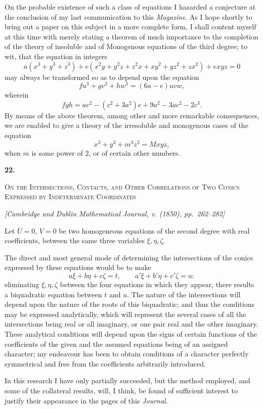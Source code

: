 \documentclass[11pt]{article}
\newcommand{\paperhead}[3]{%
  \clearpage
  \begin{center}
  {\Large\bfseries #1.}\par\vspace{0.85em}
  {\large\scshape #2}\par\vspace{0.6em}
  {\itshape [#3]}\par
  \end{center}\vspace{0.4em}}
\newcommand{\sourcepage}[1]{\marginpar{\scriptsize p.~#1}}
\begin{document}
\sourcepage{118}
On the probable existence of such a class of equations I hazarded a conjecture at the conclusion of my last communication to this \emph{Magazine}. As I hope shortly to bring out a paper on this subject in a more complete form, I shall content myself at this time with merely stating a theorem of much importance to the completion of the theory of insoluble and of Monogenous equations of the third degree; to wit, that the equation in integers
\[
a(x^3+y^3+z^3)+c(x^2y+y^2z+z^2x+xy^2+yz^2+zx^2)+exyz=0
\]
may always be transformed so as to depend upon the equation
\[
fu^3+gv^3+hw^3=(6a-e)uvw,
\]
wherein
\[
fgh=ae^2-(c^2+3a^2)e+9a^2-3ac^2-2c^3.
\]
By means of the above theorem, among other and more remarkable consequences, we are enabled to give a theory of the irresoluble and monogenous cases of the equation
\[
x^3+y^3+m^3z^3=Mxyz,
\]
when $m$ is some power of 2, or of certain other numbers.




\paperhead{22}{On the Intersections, Contacts, and Other Correlations of Two Conics Expressed by Indeterminate Coordinates}{Cambridge and Dublin Mathematical Journal, v. (1850), pp.~262--282}

\sourcepage{119}
Let $U=0$, $V=0$ be two homogeneous equations of the second degree with real coefficients, between the same three variables $\xi,\eta,\zeta$.

The direct and most general mode of determining the intersections of the conics expressed by these equations would be to make
\[
a\xi+b\eta+c\zeta=t,\qquad
a'\xi+b'\eta+c'\zeta=u:
\]
eliminating $\xi,\eta,\zeta$ between the four equations in which they appear, there results a biquadratic equation between $t$ and $u$. The nature of the intersections will depend upon the nature of the roots of this biquadratic; and thus the conditions may be expressed analytically, which will represent the several cases of all the intersections being real or all imaginary, or one pair real and the other imaginary. These analytical conditions will depend upon the signs of certain functions of the coefficients of the given and the assumed equations being of an assigned character; my endeavour has been to obtain conditions of a character perfectly symmetrical and free from the coefficients arbitrarily introduced.

In this research I have only partially succeeded, but the method employed, and some of the collateral results, will, I think, be found of sufficient interest to justify their appearance in the pages of this \emph{Journal}.
\end{document}
